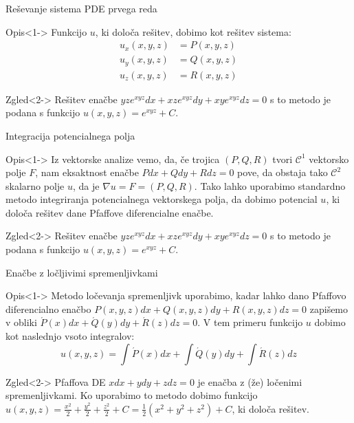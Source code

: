 \documentclass[t, 10pt]{beamer} %
\newcommand{\fillblack}[1]{
	\begin{tikzpicture}[remember picture, overlay]
		\node [shift={(0 cm,0cm)}]  at (current page.south west)
		{%
			\begin{tikzpicture}[remember picture, overlay] at (current page.south west)
				\draw [fill=black] (0, 0) -- (0,#1 \paperheight) --
				(\paperwidth,#1 \paperheight) -- (\paperwidth,0) -- cycle ;
			\end{tikzpicture}
		};
		\draw (current page.north west) rectangle (current page.south east);
	\end{tikzpicture}
}
\begin{document}
		\begin{frame}{Reševanje sistema PDE prvega reda}
			\begin{block}{Opis}<1->
				Funkcijo $u$, ki določa rešitev, dobimo kot rešitev sistema: 
				\begin{align*}
					u_x(x, y, z) &= P(x, y, z) \\
					u_y(x, y, z) &= Q(x, y, z) \\
					u_z(x, y, z) &= R(x, y, z) 
				\end{align*}
			\end{block}
			\begin{block}{Zgled}<2->
				Rešitev enačbe $yze^{xyz}dx + xze^{xyz}dy + xye^{xyz}dz = 0$ s to metodo je podana s funkcijo $u(x, y, z) = e^{xyz} + C$.
			\end{block}
		\end{frame}
		
		\begin{frame}{Integracija potencialnega polja}
			\begin{block}{Opis}<1->
				Iz vektorske analize vemo, da, če trojica $(P, Q, R)$ tvori $\mathcal{C}^1$ vektorsko polje $F$, nam eksaktnost enačbe $Pdx + Qdy + Rdz = 0$ pove, da obstaja tako $\mathcal{C}^2$ skalarno polje $u$, da je $\nabla u = F = (P, Q, R)$. Tako lahko uporabimo standardno metodo integriranja potencialnega vektorskega polja, da dobimo potencial $u$, ki določa rešitev dane Pfaffove diferencialne enačbe.
			\end{block}
			\begin{block}{Zgled}<2->
					Rešitev enačbe $yze^{xyz}dx + xze^{xyz}dy + xye^{xyz}dz = 0$ s to metodo je podana s funkcijo $u(x, y, z) = e^{xyz} + C$.
			\end{block}
		\end{frame}
		
		\begin{frame}{Enačbe z ločljivimi spremenljivkami}
			\begin{block}{Opis}<1->
					Metodo ločevanja spremenljivk uporabimo, kadar lahko dano Pfaffovo diferencialno enačbo $P(x, y, z)dx + Q(x, y, z)dy + R(x, y, z)dz = 0$ zapišemo v obliki $\acute{P}(x)dx + \acute{Q}(y)dy + \acute{R}(z)dz = 0$. V tem primeru funkcijo $u$ dobimo kot naslednjo vsoto integralov: $$u(x, y, z) = \int \acute{P}(x)dx + \int \acute{Q}(y)dy + \int \acute{R}(z)dz$$
			\end{block}
			\begin{block}{Zgled}<2->
				Pfaffova DE $xdx + ydy + zdz = 0$ je enačba z (že) ločenimi spremenljivkami. Ko uporabimo to metodo dobimo funkcijo $u(x, y, z) = \frac{x^2}{2} + \frac{y^2}{2} + \frac{z^2}{2} + C = \frac{1}{2}(x^2 + y^2 + z^2) + C$, ki določa rešitev.
			\end{block}
		\end{frame}
		
\end{document}
